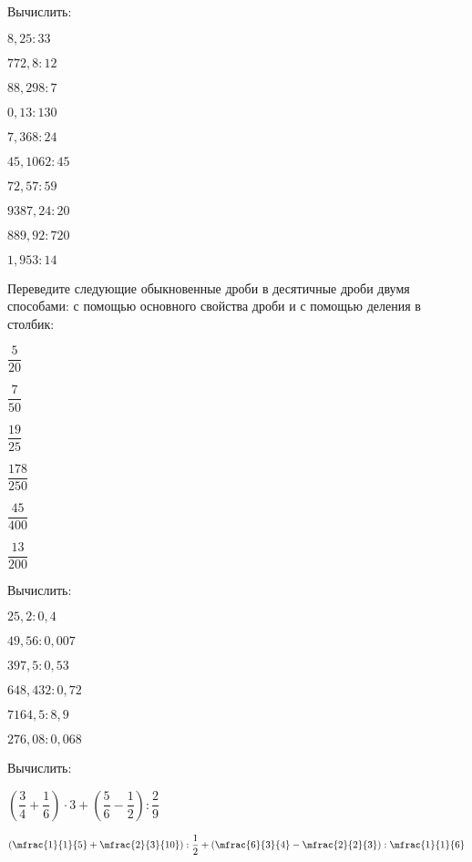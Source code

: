 \begin{listofex}
	\item Вычислить:
		\begin{enumcols}[itemcolumns=5]
			\item \( 8,25:33 \)
			\item \( 772,8:12 \)
			\item \( 88,298: 7 \)
			\item \( 0,13:130 \)
			\item \( 7,368: 24 \)
			\item \( 45,1062: 45 \)
			\item \( 72,57 :59 \)
			\item \( 9387,24: 20 \)
			\item \( 889,92:720 \)
			\item \( 1,953:14 \)
		\end{enumcols}
	\item Переведите следующие обыкновенные дроби в десятичные дроби двумя способами: с помощью основного свойства дроби и с помощью деления в столбик:
		\begin{enumcols}[itemcolumns=6]
			\item \( \dfrac{5}{20} \)
			\item \( \dfrac{7}{50} \)
			\item \( \dfrac{19}{25} \)
			\item \( \dfrac{178}{250} \)
			\item \( \dfrac{45}{400} \)
			\item \( \dfrac{13}{200} \)
		\end{enumcols}
	\item Вычислить:
		\begin{enumcols}[itemcolumns=2]
			\item \( 25,2: 0,4 \)
			\item \( 49,56:0,007 \)
			\item \( 397,5:0,53 \)
			\item \( 648,432:0,72 \)
			\item \( 7164,5:8,9 \)
			\item \( 276,08:0,068 \)
		\end{enumcols}
	\item Вычислить:
		\begin{enumcols}[itemcolumns=2]
		\item \( \left( \dfrac{3}{4}+\dfrac{1}{6} \right)\cdot 3 + \left( \dfrac{5}{6}-\dfrac{1}{2} \right) : \dfrac{2}{9} \)
		\item \( \left( \mfrac{1}{1}{5}+\mfrac{2}{3}{10} \right) : \dfrac{1}{2} + \left( \mfrac{6}{3}{4}-\mfrac{2}{2}{3} \right) : \mfrac{1}{1}{6} \)
		\end{enumcols}
\end{listofex}
